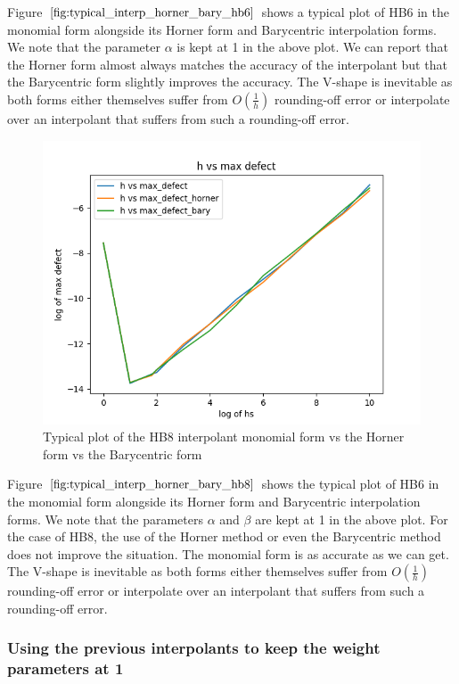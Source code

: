 \documentclass{article}
\begin{document}
Figure $\ref{fig:typical_interp_horner_bary_hb6}$ shows a typical plot of HB6 in the monomial form alongside its Horner form and Barycentric interpolation forms. We note that the parameter $\alpha$ is kept at 1 in the above plot. We can report that the Horner form almost always matches the accuracy of the interpolant but that the Barycentric form slightly improves the accuracy. The V-shape is inevitable as both forms either themselves suffer from $O(\frac{1}{h})$ rounding-off error or interpolate over an interpolant that suffers from such a rounding-off error.

\begin{figure}[H]
\centering
\includegraphics[width=0.7\linewidth]{./figures/typical_interp_horner_bary_hb8}
\caption{Typical plot of the HB8 interpolant monomial form vs the Horner form vs the Barycentric form}
\label{fig:typical_interp_horner_bary_hb8}
\end{figure}

Figure $\ref{fig:typical_interp_horner_bary_hb8}$ shows the typical plot of HB6 in the monomial form alongside its Horner form and Barycentric interpolation forms. We note that the parameters $\alpha$ and $\beta$ are kept at 1 in the above plot. For the case of HB8, the use of the Horner method or even the Barycentric method does not improve the situation. The monomial form is as accurate as we can get. The V-shape is inevitable as both forms either themselves suffer from $O(\frac{1}{h})$ rounding-off error or interpolate over an interpolant that suffers from such a rounding-off error.

\subsubsection{Using the previous interpolants to keep the weight parameters at 1}
\label{section:keeping_alpha_at_1}
\end{document}
